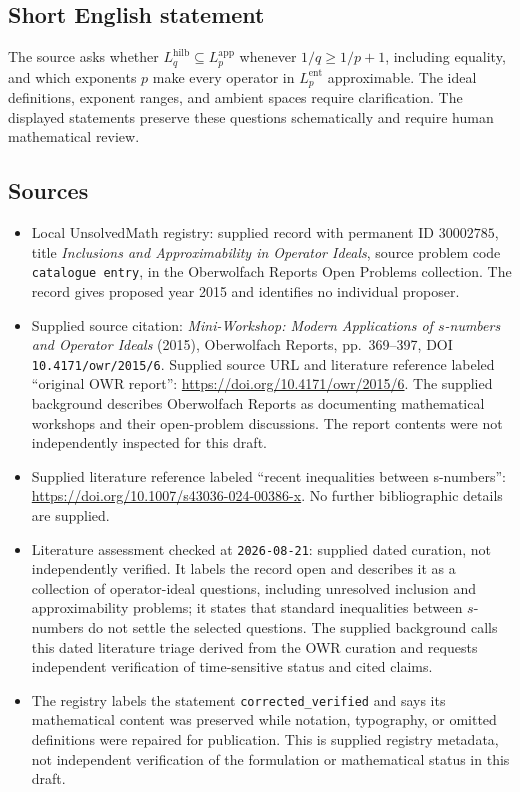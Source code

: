 \documentclass[11pt]{article}
\begin{document}
\subsection{Short English statement}
The source asks whether \(L_q^{\mathrm{hilb}}\subseteq L_p^{\mathrm{app}}\) whenever \(1/q\geq1/p+1\), including equality, and which exponents \(p\) make every operator in \(L_p^{\mathrm{ent}}\) approximable. The ideal definitions, exponent ranges, and ambient spaces require clarification. The displayed statements preserve these questions schematically and require human mathematical review.
\subsection{Sources}
\begin{itemize}
\item Local UnsolvedMath registry: supplied record with permanent ID \(30002785\), title \emph{Inclusions and Approximability in Operator Ideals}, source problem code \texttt{catalogue entry}, in the Oberwolfach Reports Open Problems collection. The record gives proposed year 2015 and identifies no individual proposer.
\item Supplied source citation: \emph{Mini-Workshop: Modern Applications of \(s\)-numbers and Operator Ideals} (2015), Oberwolfach Reports, pp.\ 369--397, DOI \texttt{10.4171/owr/2015/6}. Supplied source URL and literature reference labeled ``original OWR report'': \url{https://doi.org/10.4171/owr/2015/6}. The supplied background describes Oberwolfach Reports as documenting mathematical workshops and their open-problem discussions. The report contents were not independently inspected for this draft.
\item Supplied literature reference labeled ``recent inequalities between s-numbers'': \url{https://doi.org/10.1007/s43036-024-00386-x}. No further bibliographic details are supplied.
\item Literature assessment checked at \texttt{2026-08-21}: supplied dated curation, not independently verified. It labels the record open and describes it as a collection of operator-ideal questions, including unresolved inclusion and approximability problems; it states that standard inequalities between \(s\)-numbers do not settle the selected questions. The supplied background calls this dated literature triage derived from the OWR curation and requests independent verification of time-sensitive status and cited claims.
\item The registry labels the statement \texttt{corrected\_verified} and says its mathematical content was preserved while notation, typography, or omitted definitions were repaired for publication. This is supplied registry metadata, not independent verification of the formulation or mathematical status in this draft.
\end{itemize}
\end{document}
